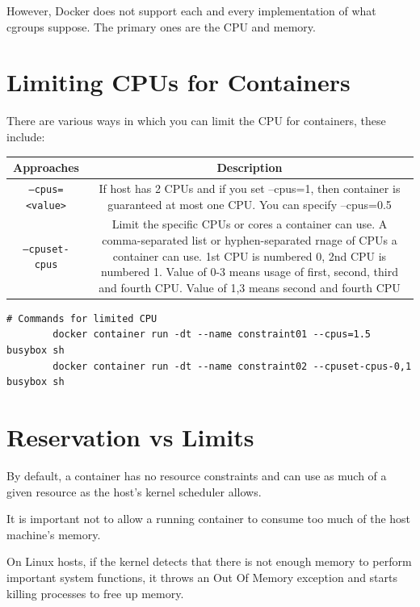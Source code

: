 \documentclass[11pt]{book}
\begin{document}
    However, Docker does not support each and every implementation of what cgroups suppose.
    The primary ones are the CPU and memory.

    \section{Limiting CPUs for Containers}
    There are various ways in which you can limit the CPU for containers, these include:

    \begin{table}[ht]
        \centering
        \begin{tabular}{|c|c|}
            \hline
            Approaches         & Description \\ \hline
            \texttt{--cpus=<value>}             & If host has 2 CPUs and if you set --cpus=1, then container is guaranteed at most one CPU. You can specify --cpus=0.5    \\ \hline
            \texttt{--cpuset-cpus}      & Limit the specific CPUs or cores a container can use. A comma-separated list or hyphen-separated rnage of CPUs a container can use. 1st CPU is numbered 0, 2nd CPU is numbered 1. Value of 0-3 means usage of first, second, third and fourth CPU. Value of 1,3 means second and fourth CPU   \\ \hline
        \end{tabular}
    \end{table}

    \begin{lstlisting}[style=terminal]
        # Commands for limited CPU
        docker container run -dt --name constraint01 --cpus=1.5 busybox sh
        docker container run -dt --name constraint02 --cpuset-cpus-0,1 busybox sh
    \end{lstlisting}

    \section{Reservation vs Limits}
    By default, a container has no resource constraints and can use as much of a given resource as the host's kernel scheduler allows.

    It is important not to allow a running container to consume too much of the host machine's memory.

    On Linux hosts, if the kernel detects that there is not enough memory to perform important system functions, it throws an Out Of Memory exception and starts killing processes to free up memory.
\end{document}
